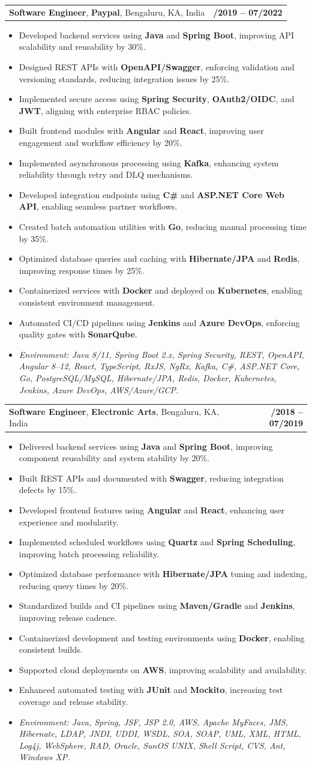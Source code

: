 \documentclass[letterpaper,11pt]{article}
\makeatletter
\newcommand{\resumeItem}[1]{
  \item\footnotesize{
    {#1 \vspace{-2pt}}
  }
}
\newcommand{\resumeSubheading}[4]{
  \vspace{-2pt}\item
    \begin{tabular*}{1.0\textwidth}[t]{l@{\extracolsep{\fill}}r}
      \textbf{\fontsize{10pt}{14pt}\selectfont #3}, \textbf{\fontsize{10pt}{14pt}\selectfont #1}, \fontsize{10pt}{14pt}\selectfont #4 & \textbf{\fontsize{10pt}{14pt}\selectfont #2} \\
    \end{tabular*}\vspace{-7pt}
}
\newcommand{\resumeItemListStart}{\begin{itemize}[leftmargin=*]}
\newcommand{\resumeItemListEnd}{\end{itemize}\vspace{-5pt}}
\makeatother
\begin{document}
\resumeSubheading
{Paypal}{08/2019 -- 07/2022}
{Software Engineer}{Bengaluru, KA, India}
\resumeItemListStart
  \resumeItem{Developed backend services using \textbf{Java} and \textbf{Spring Boot}, improving API scalability and reusability by 30\%.}
  \resumeItem{Designed REST APIs with \textbf{OpenAPI/Swagger}, enforcing validation and versioning standards, reducing integration issues by 25\%.}
  \resumeItem{Implemented secure access using \textbf{Spring Security}, \textbf{OAuth2/OIDC}, and \textbf{JWT}, aligning with enterprise RBAC policies.}
  \resumeItem{Built frontend modules with \textbf{Angular} and \textbf{React}, improving user engagement and workflow efficiency by 20\%.}
  \resumeItem{Implemented asynchronous processing using \textbf{Kafka}, enhancing system reliability through retry and DLQ mechanisms.}
  \resumeItem{Developed integration endpoints using \textbf{C\#} and \textbf{ASP.NET Core Web API}, enabling seamless partner workflows.}
  \resumeItem{Created batch automation utilities with \textbf{Go}, reducing manual processing time by 35\%.}
  \resumeItem{Optimized database queries and caching with \textbf{Hibernate/JPA} and \textbf{Redis}, improving response times by 25\%.}
  \resumeItem{Containerized services with \textbf{Docker} and deployed on \textbf{Kubernetes}, enabling consistent environment management.}
  \resumeItem{Automated CI/CD pipelines using \textbf{Jenkins} and \textbf{Azure DevOps}, enforcing quality gates with \textbf{SonarQube}.}
  \resumeItem{\textit{Environment: Java 8/11, Spring Boot 2.x, Spring Security, REST, OpenAPI, Angular 8--12, React, TypeScript, RxJS, NgRx, Kafka, C\#, ASP.NET Core, Go, PostgreSQL/MySQL, Hibernate/JPA, Redis, Docker, Kubernetes, Jenkins, Azure DevOps, AWS/Azure/GCP.}}
\resumeItemListEnd

\resumeSubheading
{Electronic Arts}{01/2018 -- 07/2019}
{Software Engineer}{Bengaluru, KA, India}
\resumeItemListStart
  \resumeItem{Delivered backend services using \textbf{Java} and \textbf{Spring Boot}, improving component reusability and system stability by 20\%.}
  \resumeItem{Built REST APIs and documented with \textbf{Swagger}, reducing integration defects by 15\%.}
  \resumeItem{Developed frontend features using \textbf{Angular} and \textbf{React}, enhancing user experience and modularity.}
  \resumeItem{Implemented scheduled workflows using \textbf{Quartz} and \textbf{Spring Scheduling}, improving batch processing reliability.}
  \resumeItem{Optimized database performance with \textbf{Hibernate/JPA} tuning and indexing, reducing query times by 20\%.}
  \resumeItem{Standardized builds and CI pipelines using \textbf{Maven/Gradle} and \textbf{Jenkins}, improving release cadence.}
  \resumeItem{Containerized development and testing environments using \textbf{Docker}, enabling consistent builds.}
  \resumeItem{Supported cloud deployments on \textbf{AWS}, improving scalability and availability.}
  \resumeItem{Enhanced automated testing with \textbf{JUnit} and \textbf{Mockito}, increasing test coverage and release stability.}
  \resumeItem{\textit{Environment: Java, Spring, JSF, JSP 2.0, AWS, Apache MyFaces, JMS, Hibernate, LDAP, JNDI, UDDI, WSDL, SOA, SOAP, UML, XML, HTML, Log4j, WebSphere, RAD, Oracle, SunOS UNIX, Shell Script, CVS, Ant, Windows XP.}}
\resumeItemListEnd
\end{document}
